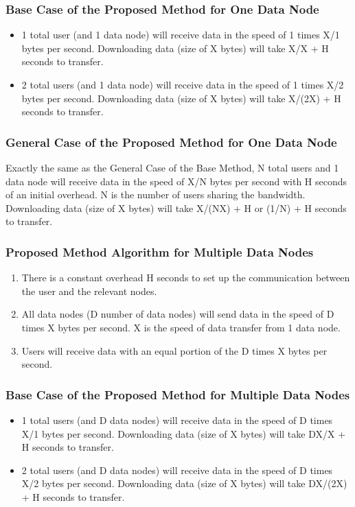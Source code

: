 \documentclass[acmsmall]{acmart}
\begin{document}
\begin{multicols}{2}
\subsubsection{Base Case of the Proposed Method for One Data Node}

\begin{itemize} 
    \item 1 total user (and 1 data node) will receive data in the speed of 1 times X/1 bytes per second. Downloading data (size of X bytes) will take X/X + H seconds to transfer.
    \item 2 total users (and 1 data node) will receive data in the speed of 1 times X/2 bytes per second. Downloading data (size of X bytes) will take X/(2X) + H seconds to transfer.
\end{itemize}


\subsubsection{General Case of the Proposed Method for One Data Node} 
Exactly the same as the  General Case of the Base Method, N total users and 1 data node will receive data in the speed of X/N bytes per second with H seconds of an initial overhead. N is the number of users sharing the bandwidth. Downloading data (size of X bytes)  will take X/(NX) + H or (1/N) + H seconds to transfer.

\subsubsection{Proposed Method Algorithm for Multiple Data Nodes}
\begin{enumerate}
    \item There is a constant overhead H seconds to set up the communication between the user and the relevant nodes.
    \item All data nodes (D number of data nodes) will send data in the speed of D times X bytes per second. X is the speed of data transfer from 1 data node.
    \item Users will receive data with an equal portion of the D times X bytes per second.
\end{enumerate}


\subsubsection{Base Case of the Proposed Method for Multiple Data Nodes}
\begin{itemize}
    \item 1 total users (and D data nodes) will receive data in the speed of D times X/1 bytes per second. Downloading data (size of X bytes) will take DX/X + H seconds to transfer.
    \item 2 total users (and D data nodes) will receive data in the speed of D times X/2 bytes per second. Downloading data (size of X bytes) will take DX/(2X) + H seconds to transfer.
\end{itemize}





\end{multicols}
\end{document}
